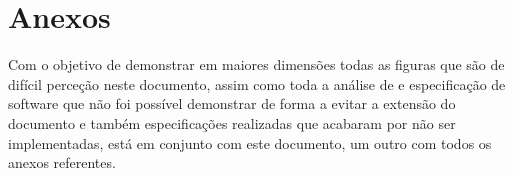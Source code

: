 \chapter{Anexos}
Com o objetivo de demonstrar em maiores dimensões todas as figuras que são de difícil perceção neste documento, assim como toda a análise de e especificação de software que não foi possível demonstrar de forma a evitar a extensão do documento e também especificações realizadas que acabaram por não ser implementadas, está em conjunto com este documento, um outro com todos os anexos referentes.
